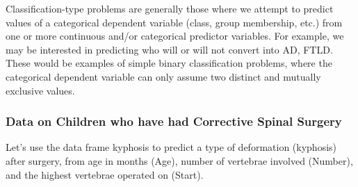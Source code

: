 \documentclass[final, paper=letter,5p,times,twocolumn]{elsarticle}
\begin{document}
Classification-type problems are generally those where we attempt to predict values of a categorical dependent variable (class, group membership, etc.) from one or more continuous and/or categorical predictor variables. For example, we may be interested in predicting who will or will not convert into AD, FTLD. These would be examples of simple binary classification problems, where the categorical dependent variable can only assume two distinct and mutually exclusive values.


\subsubsection{Data on Children who have had Corrective Spinal Surgery}

Let's use the data frame kyphosis to predict a type of deformation (kyphosis) after surgery, from age in months (Age), number of vertebrae involved (Number), and the highest vertebrae operated on (Start).
\end{document}
